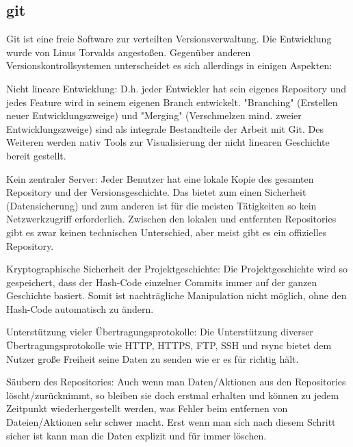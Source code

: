 \subsection{git}
Git ist eine freie Software zur verteilten Versionsverwaltung. Die Entwicklung wurde von Linus Torvalds angestoßen. Gegenüber anderen Versionskontrollsystemen unterscheidet es sich allerdings in einigen Aspekten:

\noindent Nicht lineare Entwicklung:
D.h. jeder Entwickler hat sein eigenes Repository und jedes Feature wird in seinem eigenen Branch entwickelt. "Branching" (Erstellen neuer Entwicklungszweige) und "Merging" (Verschmelzen mind. zweier Entwicklungszweige) sind als integrale Bestandteile der Arbeit mit Git. Des Weiteren werden nativ Tools zur Visualisierung der nicht linearen Geschichte bereit gestellt.

\noindent Kein zentraler Server:
Jeder Benutzer hat eine lokale Kopie des gesamten Repository und der Versionsgeschichte. Das bietet zum einen Sicherheit (Datensicherung) und zum anderen ist für die meisten Tätigkeiten so kein Netzwerkzugriff erforderlich. Zwischen den lokalen und entfernten Repositories gibt es zwar keinen technischen Unterschied, aber meist gibt es ein offizielles Repository.

\noindent Kryptographische Sicherheit der Projektgeschichte:
Die Projektgeschichte wird so gespeichert, dass der Hash-Code einzelner Commits immer auf der ganzen Geschichte basiert. Somit ist nachträgliche Manipulation nicht möglich, ohne den Hash-Code automatisch zu ändern.

\noindent Unterstützung vieler Übertragungsprotokolle:
Die Unterstützung diverser Übertragungsprotokolle wie HTTP, HTTPS, FTP, SSH und rsync bietet dem Nutzer große Freiheit seine Daten zu senden wie er es für richtig hält.

\noindent Säubern des Repositories:
Auch wenn man Daten/Aktionen aus den Repositories löscht/zurück\-nimmt, so bleiben sie doch erstmal erhalten und können zu jedem Zeitpunkt wiederhergestellt werden, was Fehler beim entfernen von Dateien/Aktionen sehr schwer macht. Erst wenn man sich nach diesem Schritt sicher ist kann man die Daten explizit und für immer löschen.
\cite{gitwiki}	
